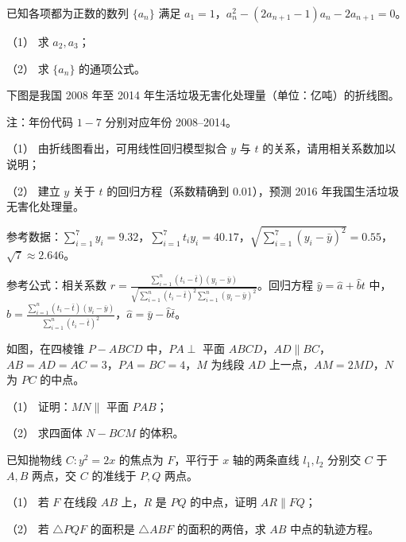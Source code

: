 \begin{question}
已知各项都为正数的数列 \(\{a_n\}\) 满足 \(a_1=1\)，\(a_n^2-(2a_{n+1}-1)a_n-2a_{n+1}=0\)。

（1） 求 \(a_2,a_3\)；

（2） 求 \(\{a_n\}\) 的通项公式。

\Needspace{0.4\textheight}
\end{question}
\begin{question}
下图是我国 2008 年至 2014 年生活垃圾无害化处理量（单位：亿吨）的折线图。
\nopagebreak[4]
\begin{center}\end{center}
\nopagebreak[4]
注：年份代码 \(1-7\) 分别对应年份 2008–2014。

（1） 由折线图看出，可用线性回归模型拟合 \(y\) 与 \(t\) 的关系，请用相关系数加以说明；

（2） 建立 \(y\) 关于 \(t\) 的回归方程（系数精确到 0.01），预测 2016 年我国生活垃圾无害化处理量。

参考数据：\(\displaystyle\sum_{i=1}^7 y_i=9.32\)，\(\displaystyle\sum_{i=1}^7t_i y_i=40.17\)，\(\displaystyle\sqrt{\sum_{i=1}^7(y_i-\bar y)^2}=0.55\)，\(\sqrt7\approx2.646\)。

参考公式：相关系数 \(\displaystyle r=\frac{\sum_{i=1}^n(t_i-\bar t)(y_i-\bar y)}{\sqrt{\sum_{i=1}^n(t_i-\bar t)^2\sum_{i=1}^n(y_i-\bar y)^2}}\)。回归方程 \(\hat y=\hat a+\hat bt\) 中，\(\displaystyle\hat b=\frac{\sum_{i=1}^n(t_i-\bar t)(y_i-\bar y)}{\sum_{i=1}^n(t_i-\bar t)^2}\)，\(\hat a=\bar y-\hat b\bar t\)。

\Needspace{0.4\textheight}
\end{question}
\begin{question}
如图，在四棱锥 \(P-ABCD\) 中，\(PA\perp\) 平面 \(ABCD\)，\(AD\parallel BC\)，\(AB=AD=AC=3\)，\(PA=BC=4\)，\(M\) 为线段 \(AD\) 上一点，\(AM=2MD\)，\(N\) 为 \(PC\) 的中点。
\nopagebreak[4]
\begin{center}\end{center}
\nopagebreak[4]
（1） 证明：\(MN\parallel\) 平面 \(PAB\)；

（2） 求四面体 \(N-BCM\) 的体积。

\end{question}
\begin{question}
已知抛物线 \(C:y^2=2x\) 的焦点为 \(F\)，平行于 \(x\) 轴的两条直线 \(l_1,l_2\) 分别交 \(C\) 于 \(A,B\) 两点，交 \(C\) 的准线于 \(P,Q\) 两点。

（1） 若 \(F\) 在线段 \(AB\) 上，\(R\) 是 \(PQ\) 的中点，证明 \(AR\parallel FQ\)；

（2） 若 \(\triangle PQF\) 的面积是 \(\triangle ABF\) 的面积的两倍，求 \(AB\) 中点的轨迹方程。

\end{question}

